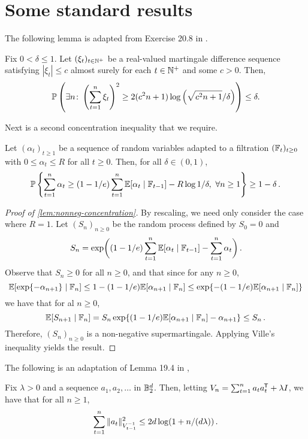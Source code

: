 \section{Some standard results}\label{appendix:useful}

The following lemma is adapted from Exercise 20.8 in \citet{lattimore2020bandit}.

\begin{lemma}\label{lem:time-unif-bound}
  Fix $0 < \delta \leq 1$. Let $(\xi_t)_{t \in \N^+}$ be a real-valued martingale difference sequence satisfying $|\xi_t| \leq c$ almost surely for each $t \in \N^+$ and some $c > 0$. Then,
  \begin{equation*}
      \P\left(\exists n \colon \left(\sum_{t=1}^n \xi_t\right)^2 \geq 2(c^2n+1)\log\left(\sqrt{c^2n+1}/\delta \right)\right) \leq \delta.
  \end{equation*}
\end{lemma}

Next is a second concentration inequality that we require.

\begin{lemma}\label{lem:nonneg-concentration}
  Let $(\alpha_t)_{t \geq 1}$ be a sequence of random variables adapted to a filtration $(\FF_t)_{t \geq 0}$ with $0 \leq \alpha_t \leq R$ for all $t \geq 0$. Then, for all $\delta \in (0,1)$,
  $$
      \P\left\{\sum_{t=1}^n \alpha_t \geq (1-1/e) \sum_{t=1}^n \E[\alpha_t \mid \FF_{t-1}] - R \log 1/\delta,\  \forall n \geq 1\right\} \geq 1 - \delta\,.
  $$
\end{lemma}

\begin{proof}[Proof of \cref{lem:nonneg-concentration}]
  By rescaling, we need only consider the case where $R=1$. Let $(S_n)_{n \geq 0}$ be the random process defined by $S_0 = 0$ and 
  $$
      S_n = \exp \!\bigg((1-1/e) \sum_{t=1}^n \E[\alpha_t \mid \FF_{t-1}] - \sum_{t=1}^n \alpha_t \bigg)\,.
  $$
  Observe that $S_n \geq 0$ for all $n \geq 0$, and that since for any $n \geq 0$,
  $$
      \E[\exp\{-\alpha_{n+1}\} \mid \FF_n] \leq 1 - (1-1/e) \E[\alpha_{n+1} \mid \FF_n] \leq \exp\{-(1-1/e) \E[\alpha_{n+1} \mid \FF_{n}] \}
  $$
  we have that for al $n \geq 0$,
  $$
      \E[S_{n+1} \mid \FF_n] = S_n \exp\{(1-1/e)\E[\alpha_{n+1} \mid \FF_n] - \alpha_{n+1}\} \leq S_n\,.
  $$
  Therefore, $(S_n)_{n \geq 0}$ is a non-negative supermartingale. Applying Ville's inequality yields the result.
\end{proof}

The following is an adaptation of Lemma 19.4 in \citet{lattimore2020bandit}, 
\begin{lemma}\label{lem:epl}
  Fix $\lambda > 0$ and a sequence $a_1, a_2, \dots$ in $\Bd$. Then, letting $V_n = \sum_{t=1}^n a_t a_t\tran + \lambda I$, we have that for all $n \geq 1$,
  $$
      \sum_{t=1}^n \vinvnorm{a_t}^2 \leq 2d \log(1 + n/(d\lambda))\,.
  $$
\end{lemma}


\clearpage





